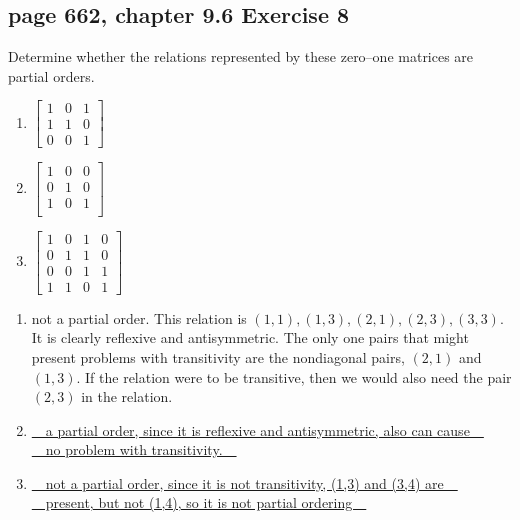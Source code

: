 \documentclass[sigconf]{acmart}
\begin{document}
\subsection{page 662, chapter 9.6 Exercise 8}
\begin{shaded}
     Determine whether the relations represented by these zero–one matrices are partial orders.
    \begin{enumerate}[label=(\alph*)]
        \item 
        $
    	\begin{bmatrix}
    	   1 & 0 & 1 \\
     	   1 & 1 & 0 \\
     	   0 & 0 & 1
    	\end{bmatrix}
    	$
    	\item 
    	$
    	\begin{bmatrix}
    	   1 & 0 & 0 \\
     	   0 & 1 & 0 \\
           1 & 0 & 1 \\
    	\end{bmatrix}
    	$
    	\item 
    	$
    	\begin{bmatrix}
    	   1 & 0 & 1 & 0 \\
     	   0 & 1 & 1 & 0 \\
           0 & 0 & 1 & 1 \\
     	   1 & 1 & 0 & 1
    	\end{bmatrix}
    	$
    \end{enumerate}
\end{shaded}
\begin{enumerate}[label=(\alph*)]
    \item not a partial order. This relation is $(1, 1), (1, 3), (2, 1), (2, 3), (3, 3)$. It is clearly reflexive and antisymmetric. The only one pairs that might present problems with transitivity are the nondiagonal pairs, $(2, 1)$ and $(1, 3)$. If the relation were to be transitive, then we would also need the pair $(2, 3)$ in the relation.
 	\item \underline{~~a partial order, since it is reflexive and antisymmetric, also can cause~~}\\
 	\underline{~~no problem with transitivity.~~}
	\item \underline{~~not a partial order, since it is not transitivity, (1,3) and (3,4) are~~}\\
	\underline{~~present, but not (1,4), so it is not partial ordering~~}
\end{enumerate}
\end{document}
